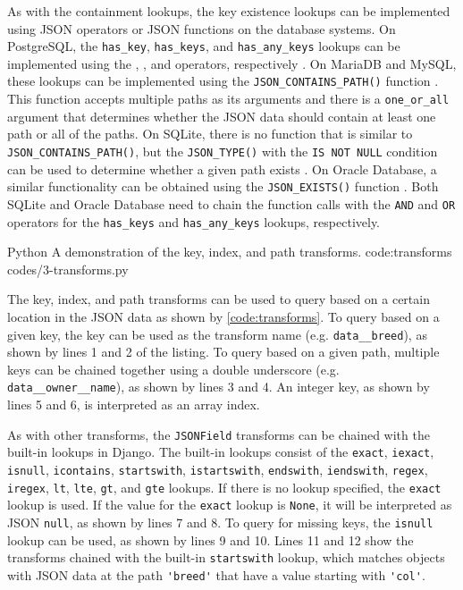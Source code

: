 As with the containment lookups, the key existence lookups can be implemented
using JSON operators or JSON functions on the database systems. On PostgreSQL,
the \verb|has_key|, \verb|has_keys|, and \verb|has_any_keys| lookups can be
implemented using the , , and  operators,
respectively \cite{postgres:json_operators}. On MariaDB and MySQL, these
lookups can be implemented using the \verb|JSON_CONTAINS_PATH()| function
\cite{mariadb:json_contains_path, mysql:json_search}. This function accepts
multiple paths as its arguments and there is a \verb|one_or_all| argument that
determines whether the JSON data should contain at least one path or all of the
paths. On SQLite, there is no function that is similar to
\verb|JSON_CONTAINS_PATH()|, but the \verb|JSON_TYPE()| with the
\verb|IS NOT NULL| condition can be used to determine whether a given path
exists \cite{sqlite:json1}. On Oracle Database, a similar functionality can be
obtained using the \verb|JSON_EXISTS()| function \cite{oracle:json_exists}. Both
SQLite and Oracle Database need to chain the function calls with the \verb|AND|
and \verb|OR| operators for the \verb|has_keys| and \verb|has_any_keys|
lookups, respectively.

\listing
{Python}
{A demonstration of the key, index, and path transforms.}
{code:transforms}
{codes/3-transforms.py}

The key, index, and path transforms can be used to query based on a certain
location in the JSON data as shown by \autoref{code:transforms}. To query based
on a given key, the key can be used as the transform name (e.g.
\verb|data__breed|), as shown by lines 1 and 2 of the listing. To query based
on a given path, multiple keys can be chained together using a double
underscore (e.g. \verb|data__owner__name|), as shown by lines 3 and 4. An
integer key, as shown by lines 5 and 6, is interpreted as an array index.

As with other transforms, the \verb|JSONField| transforms can be chained with
the built-in lookups in Django. The built-in lookups consist of the
\verb|exact|, \verb|iexact|, \verb|isnull|, \verb|icontains|,
\verb|startswith|, \verb|istartswith|, \verb|endswith|, \verb|iendswith|,
\verb|regex|, \verb|iregex|, \verb|lt|, \verb|lte|, \verb|gt|, and \verb|gte|
lookups. If there is no lookup specified, the \verb|exact| lookup is used. If
the value for the \verb|exact| lookup is \verb|None|, it will be interpreted as
JSON \verb|null|, as shown by lines 7 and 8. To query for missing keys, the
\verb|isnull| lookup can be used, as shown by lines 9 and 10. Lines 11 and 12
show the transforms chained with the built-in \verb|startswith| lookup, which
matches objects with JSON data at the path \verb|'breed'| that have a value
starting with \verb|'col'|.

